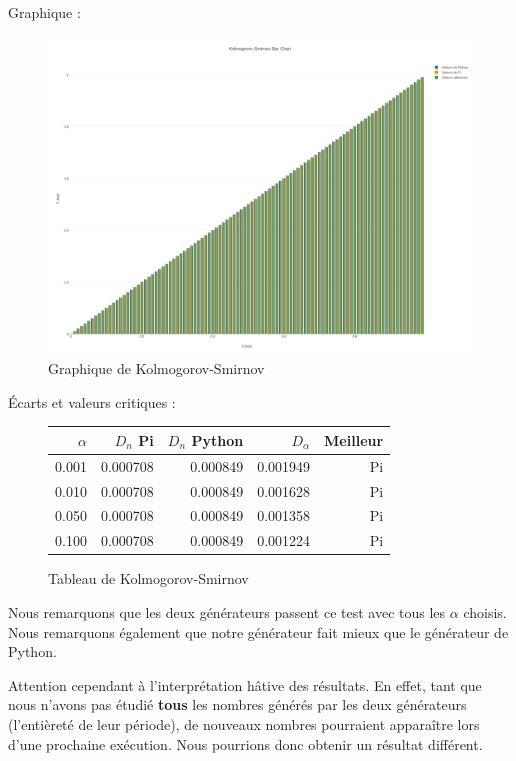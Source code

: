 \documentclass[10pt,a4paper]{article}
\begin{document}
	\newpage
	Graphique :
	\begin{figure}[h]
		\centering
		\includegraphics[scale=0.25]{../chart_images/kolmogorov-smirnov_bar_chart.png}
		\caption{Graphique de Kolmogorov-Smirnov}
	\end{figure}
	
	Écarts et valeurs critiques :
	\begin{figure}[h]
		\centering
		\begin{tabular}{|r|r|r|r|r|}
			\hline
			$\alpha$ & $D_n$ Pi & $D_n$ Python & $D_{\alpha}$ & Meilleur\\
			\hline
			0.001 & 0.000708 & 0.000849 & 0.001949 & Pi\\
			0.010 & 0.000708 & 0.000849 & 0.001628 & Pi\\
			0.050 & 0.000708 & 0.000849 & 0.001358 & Pi\\
			0.100 & 0.000708 & 0.000849 & 0.001224 & Pi\\
			\hline
		\end{tabular}
		\caption{Tableau de Kolmogorov-Smirnov}
	\end{figure}
	
	Nous remarquons que les deux générateurs passent ce test avec tous les $\alpha$ choisis.
	Nous remarquons également que notre générateur fait mieux que le générateur de Python.
	
	Attention cependant à l'interprétation hâtive des résultats.
	En effet, tant que nous n'avons pas étudié \textbf{tous} les nombres générés par les deux générateurs (l'entièreté de leur période), de nouveaux nombres pourraient apparaître lors d'une prochaine exécution. Nous pourrions donc obtenir un résultat différent.
	
\end{document}
